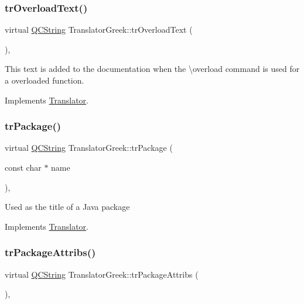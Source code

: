 \subsubsection{\texorpdfstring{trOverloadText()}{trOverloadText()}}
{\footnotesize\ttfamily virtual \mbox{\hyperlink{class_q_c_string}{Q\+C\+String}} Translator\+Greek\+::tr\+Overload\+Text (\begin{DoxyParamCaption}{ }\end{DoxyParamCaption})\hspace{0.3cm}{\ttfamily [inline]}, {\ttfamily [virtual]}}

This text is added to the documentation when the \textbackslash{}overload command is used for a overloaded function. 

Implements \mbox{\hyperlink{class_translator}{Translator}}.

\mbox{\label{class_translator_greek_a475756c536577fc808bde247f3753e84}} 
\subsubsection{\texorpdfstring{trPackage()}{trPackage()}}
{\footnotesize\ttfamily virtual \mbox{\hyperlink{class_q_c_string}{Q\+C\+String}} Translator\+Greek\+::tr\+Package (\begin{DoxyParamCaption}\item[{const char $\ast$}]{name }\end{DoxyParamCaption})\hspace{0.3cm}{\ttfamily [inline]}, {\ttfamily [virtual]}}

Used as the title of a Java package 

Implements \mbox{\hyperlink{class_translator}{Translator}}.

\mbox{\label{class_translator_greek_a16fab3dbe3a2b78ae4131630f34d5c7f}} 
\subsubsection{\texorpdfstring{trPackageAttribs()}{trPackageAttribs()}}
{\footnotesize\ttfamily virtual \mbox{\hyperlink{class_q_c_string}{Q\+C\+String}} Translator\+Greek\+::tr\+Package\+Attribs (\begin{DoxyParamCaption}{ }\end{DoxyParamCaption})\hspace{0.3cm}{\ttfamily [inline]}, {\ttfamily [virtual]}}

